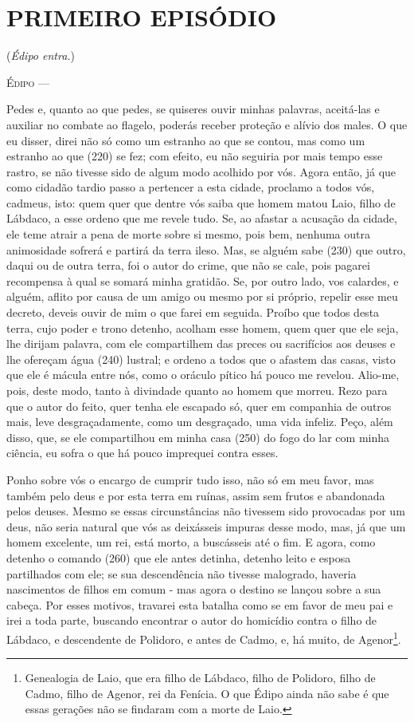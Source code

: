\section{PRIMEIRO EPISÓDIO}

(\emph{Édipo entra.})

\textsc{Édipo} ---

Pedes e, quanto ao que pedes, se quiseres ouvir minhas palavras,
aceitá-las e auxiliar no combate ao flagelo, poderás receber proteção e
alívio dos males. O que eu disser, direi não só como um estranho ao que
se contou, mas como um estranho ao que (220) se fez; com efeito, eu não
seguiria por mais tempo esse rastro, se não tivesse sido de algum modo
acolhido por vós. Agora então, já que como cidadão tardio passo a
pertencer a esta cidade, proclamo a todos vós, cadmeus, isto: quem quer
que dentre vós saiba que homem matou Laio, filho de Lábdaco, a esse
ordeno que me revele tudo. Se, ao afastar a acusação da cidade, ele teme
atrair a pena de morte sobre si mesmo, pois bem, nenhuma outra
animosidade sofrerá e partirá da terra ileso. Mas, se alguém sabe (230)
que outro, daqui ou de outra terra, foi o autor do crime, que não se
cale, pois pagarei recompensa à qual se somará minha gratidão. Se, por
outro lado, vos calardes, e alguém, aflito por causa de um amigo ou
mesmo por si próprio, repelir esse meu decreto, deveis ouvir de mim o
que farei em seguida. Proíbo que todos desta terra, cujo poder e trono
detenho, acolham esse homem, quem quer que ele seja, lhe dirijam
palavra, com ele compartilhem das preces ou sacrifícios aos deuses e lhe
ofereçam água (240) lustral; e ordeno a todos que o afastem das casas,
visto que ele é mácula entre nós, como o oráculo pítico há pouco me
revelou. Alio-me, pois, deste modo, tanto à divindade quanto ao homem
que morreu. Rezo para que o autor do feito, quer tenha ele escapado só,
quer em companhia de outros mais, leve desgraçadamente, como um
desgraçado, uma vida infeliz. Peço, além disso, que, se ele compartilhou
em minha casa (250) do fogo do lar com minha ciência, eu sofra o que há
pouco imprequei contra esses.

Ponho sobre vós o encargo de cumprir tudo isso, não só em meu favor, mas
também pelo deus e por esta terra em ruínas, assim sem frutos e
abandonada pelos deuses. Mesmo se essas circunstâncias não tivessem sido
provocadas por um deus, não seria natural que vós as deixásseis impuras
desse modo, mas, já que um homem excelente, um rei, está morto, a
buscásseis até o fim. E agora, como detenho o comando (260) que ele
antes detinha, detenho leito e esposa partilhados com ele; se sua
descendência não tivesse malogrado, haveria nascimentos de filhos em
comum - mas agora o destino se lançou sobre a sua cabeça. Por esses
motivos, travarei esta batalha como se em favor de meu pai e irei a toda
parte, buscando encontrar o autor do homicídio contra o filho de
Lábdaco, e descendente de Polidoro, e antes de Cadmo, e, há muito, de
Agenor\footnote{Genealogia de Laio, que era filho de Lábdaco, filho de
  Polidoro, filho de Cadmo, filho de Agenor, rei da Fenícia. O que Édipo
  ainda não sabe é que essas gerações não se findaram com a morte de
  Laio.}.

